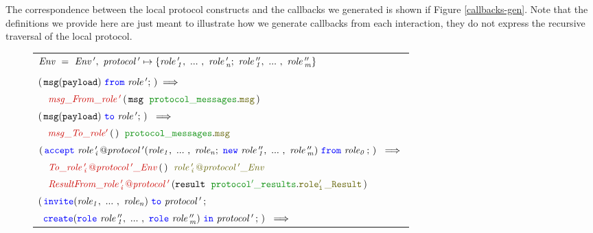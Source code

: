\documentclass[12pt,twoside]{report}
\begin{document}
The correspondence between the local protocol constructs and the callbacks we generated is shown if Figure \ref{callbacks-gen}. Note that the definitions we provide here are just meant to illustrate how we generate callbacks from each interaction, they do not express the recursive traversal of the local protocol.\\

\begin{figure}[!h]
    \begin{center}
        \begin{tabular}{l}
            $\mathit{Env\ =\ Env\,',\ protocol\,' \mapsto \{\roles{role\,'}{n};\ \roles{role\,''}{m}\}}$\\\\

            $(\,\scrmessage{msg}{payload}\ \from\ \mathit{role\,'};\,) \implies$\\[6pt]
            
            $\quad \functionname{msg\_From\_role\,'}\,(\,\varname{msg}\ \;\pkgstructaccess{protocol\_messages}{msg}\,)\;\ $\\[15pt]
            
            $(\,\scrmessage{msg}{payload}\ \scrto\ \mathit{role\,'};\,)\ \implies$\\[6pt] 
            
            $\quad \functionname{msg\_To\_role'}\,(\,)\;\ \pkgstructaccess{protocol\_messages}{msg}$\\[15pt]
            
            $(\,\acceptL{role\,'_i\,@protocol\,'}{role}{role\,''}{role_0}\,;\,)\ \implies$\\[6pt]
            
            $\quad \functionname{To\_\localprotocol{role\,'_i\,}{protocol\,'}\_Env}\,(\,)\;\ \interfacename{\localprotocol{role\,'_i\,}{protocol\,'}\_Env}$\\[3pt]

            $\quad \functionname{ResultFrom\_\localprotocol{role\,'_i\,}{protocol\,'}}\,(\varname{result}\ \;\pkgstructaccess{protocol'\_results}{role'_i\,\_Result}\,)\;$\\[15pt]

            $(\,\invite(\roles{role}{n})\ \scrto\ \mathit{protocol\,'}\,;$\\[1.5pt] 
            $\ \,\create(\rolessig{role\,''}{m})\ \scrin\ \mathit{protocol\,'}\,;\,)\ \implies$\\[6pt]
            

\end{tabular}
\end{center}
\end{figure}
\end{document}
